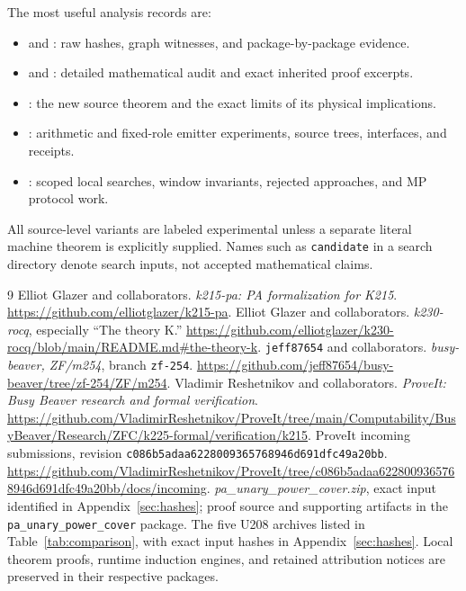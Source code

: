 \documentclass[11pt,a4paper]{article}
\newcommand{\code}[1]{\texttt{#1}}
\begin{document}
The most useful analysis records are:
\begin{itemize}
\item {} and
      : raw hashes,
      graph witnesses, and package-by-package evidence.
\item {} and :
      detailed mathematical audit and exact inherited proof excerpts.
\item {}: the new source theorem
      and the exact limits of its physical implications.
\item {}: arithmetic and fixed-role emitter
      experiments, source trees, interfaces, and receipts.
\item {}: scoped local searches,
      window invariants, rejected approaches, and MP protocol work.
\end{itemize}
All source-level variants are labeled experimental unless a separate literal
machine theorem is explicitly supplied. Names such as \code{candidate} in a
search directory denote search inputs, not accepted mathematical claims.

\begin{thebibliography}{9}
 Elliot Glazer and collaborators.
\emph{k215-pa: PA formalization for K215}.
\url{https://github.com/elliotglazer/k215-pa}.
 Elliot Glazer and collaborators.
\emph{k230-rocq}, especially ``The theory K.''
\url{https://github.com/elliotglazer/k230-rocq/blob/main/README.md#the-theory-k}.
 \code{jeff87654} and collaborators.
\emph{busy-beaver, ZF/m254}, branch \code{zf-254}.
\url{https://github.com/jeff87654/busy-beaver/tree/zf-254/ZF/m254}.
 Vladimir Reshetnikov and collaborators.
\emph{ProveIt: Busy Beaver research and formal verification}.
\url{https://github.com/VladimirReshetnikov/ProveIt/tree/main/Computability/BusyBeaver/Research/ZFC/k225-formal/verification/k215}.
 ProveIt incoming submissions, revision
\code{c086b5adaa6228009365768946d691dfc49a20bb}.
\url{https://github.com/VladimirReshetnikov/ProveIt/tree/c086b5adaa6228009365768946d691dfc49a20bb/docs/incoming}.
 \emph{pa\_unary\_power\_cover.zip}, exact input identified in
Appendix~\ref{sec:hashes}; proof source and supporting artifacts in the
\code{pa\_unary\_power\_cover} package.
 The five U208 archives listed in Table~\ref{tab:comparison},
with exact input hashes in Appendix~\ref{sec:hashes}. Local theorem proofs,
runtime induction engines, and retained attribution notices are preserved
in their respective packages.
\end{thebibliography}
\end{document}
